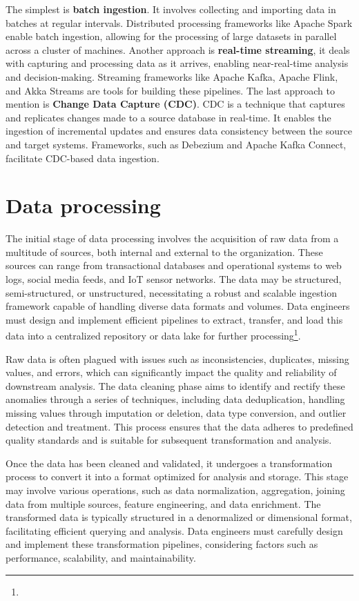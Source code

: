 The simplest is \textbf{batch ingestion}. It involves collecting and importing data in batches at regular intervals.  Distributed processing frameworks like Apache Spark enable batch ingestion, allowing for the processing of large datasets in parallel across a cluster of machines. Another approach is \textbf{real-time streaming}, it deals with capturing and processing data as it arrives, enabling near-real-time analysis and decision-making. Streaming frameworks like Apache Kafka, Apache Flink, and Akka Streams are tools for building these pipelines. The last approach to mention is \textbf{Change Data Capture (CDC)}. CDC is a technique that captures and replicates changes made to a source database in real-time. It enables the ingestion of incremental updates and ensures data consistency between the source and target systems. Frameworks, such as Debezium and Apache Kafka Connect, facilitate CDC-based data ingestion\footnotemark[16].

\section{Data processing}

The initial stage of data processing involves the acquisition of raw data from a multitude of sources, both internal and external to the organization. These sources can range from transactional databases and operational systems to web logs, social media feeds, and IoT sensor networks. The data may be structured, semi-structured, or unstructured, necessitating a robust and scalable ingestion framework capable of handling diverse data formats and volumes. Data engineers must design and implement efficient pipelines to extract, transfer, and load this data into a centralized repository or data lake for further processing\footnote[10]{}.

Raw data is often plagued with issues such as inconsistencies, duplicates, missing values, and errors, which can significantly impact the quality and reliability of downstream analysis. The data cleaning phase aims to identify and rectify these anomalies through a series of techniques, including data deduplication, handling missing values through imputation or deletion, data type conversion, and outlier detection and treatment. This process ensures that the data adheres to predefined quality standards and is suitable for subsequent transformation and analysis\footnotemark[10].

Once the data has been cleaned and validated, it undergoes a transformation process to convert it into a format optimized for analysis and storage. This stage may involve various operations, such as data normalization, aggregation, joining data from multiple sources, feature engineering, and data enrichment. The transformed data is typically structured in a denormalized or dimensional format, facilitating efficient querying and analysis. Data engineers must carefully design and implement these transformation pipelines, considering factors such as performance, scalability, and maintainability\footnotemark[10].

